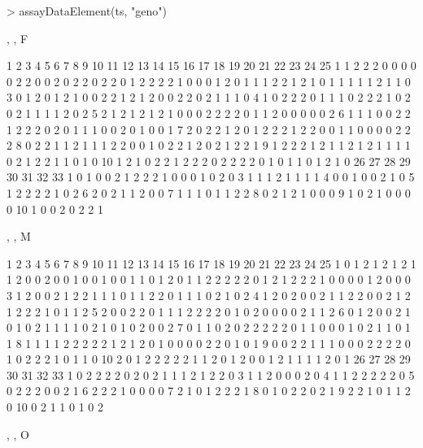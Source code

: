 \documentclass[10pt]{article}
\begin{document}
\begin{Schunk}
\begin{Sinput}
> assayDataElement(ts, "geno")
\end{Sinput}
\begin{Soutput}
, , F

   1 2 3 4 5 6 7 8 9 10 11 12 13 14 15 16 17 18 19 20 21 22 23 24 25
1  1 2 2 2 0 0 0 0 0  2  2  0  0  2  0  2  2  0  2  2  0  1  2  2  2
2  1 0 0 0 1 2 0 1 1  1  2  2  1  2  1  0  1  1  1  1  1  2  1  1  0
3  0 1 2 0 1 2 1 0 0  2  2  1  2  1  2  0  0  2  2  0  2  1  1  1  0
4  1 0 2 2 2 0 1 1 1  0  2  2  2  1  0  2  0  2  1  1  1  1  2  0  2
5  2 1 2 1 2 1 2 1 0  0  0  2  2  2  2  0  1  1  2  0  0  0  0  0  2
6  1 1 1 0 0 2 2 1 2  2  2  0  2  0  1  1  1  0  0  2  0  1  0  0  1
7  2 0 2 2 1 2 0 1 2  2  2  1  2  2  0  0  1  1  0  0  0  0  2  2  2
8  0 2 2 1 1 2 1 1 1  2  2  0  0  1  0  2  2  1  2  0  2  1  2  2  1
9  1 2 2 2 1 2 1 1 2  1  2  1  1  1  1  0  2  1  2  2  1  1  0  1  0
10 1 2 1 0 2 2 1 2 2  2  0  2  2  2  2  0  1  0  1  1  0  1  2  1  0
   26 27 28 29 30 31 32 33
1   0  1  0  0  2  1  2  2
2   1  0  0  0  1  0  2  0
3   1  1  1  2  1  1  1  1
4   0  0  1  0  0  2  1  0
5   1  2  2  2  2  1  0  2
6   2  0  2  1  1  2  0  0
7   1  1  1  0  1  1  2  2
8   0  2  1  2  1  0  0  0
9   1  0  2  1  0  0  0  0
10  1  0  0  2  0  2  2  1

, , M

   1 2 3 4 5 6 7 8 9 10 11 12 13 14 15 16 17 18 19 20 21 22 23 24 25
1  0 1 2 1 2 1 2 1 1  2  0  0  2  0  0  1  0  0  1  0  0  1  1  0  1
2  0 1 1 2 2 2 2 2 0  1  2  1  2  2  2  1  0  0  0  0  1  2  0  0  0
3  1 2 0 0 2 1 2 2 1  1  1  0  1  1  2  2  0  1  1  1  0  2  1  0  2
4  1 2 0 2 0 0 2 1 1  2  2  0  0  2  1  2  1  2  2  2  1  0  1  1  2
5  2 0 0 2 2 0 1 1 1  2  2  2  2  0  1  0  2  0  0  0  0  2  1  1  2
6  0 1 2 0 0 2 1 0 1  0  2  1  1  1  1  0  2  1  0  1  0  2  0  0  2
7  0 1 1 0 2 0 2 2 2  2  2  0  1  1  0  0  0  1  0  2  1  1  0  1  1
8  1 1 1 1 2 2 2 2 2  1  2  1  2  0  1  0  0  0  0  2  2  0  1  0  1
9  0 0 2 2 1 1 1 0 0  0  2  2  2  2  0  1  0  2  2  2  1  0  1  1  0
10 2 0 1 2 2 2 2 2 1  1  2  0  1  2  0  0  1  2  1  1  1  1  2  0  1
   26 27 28 29 30 31 32 33
1   0  2  2  2  2  0  2  0
2   1  1  1  2  1  2  2  0
3   1  1  2  0  0  0  2  0
4   1  1  2  2  2  2  2  0
5   0  2  2  2  0  0  2  1
6   2  2  2  1  0  0  0  0
7   2  1  0  1  2  2  2  1
8   0  1  0  2  2  0  2  1
9   2  2  1  0  1  1  2  0
10  0  2  1  1  0  1  0  2

, , O


\end{Soutput}
\end{Schunk}
\end{document}
